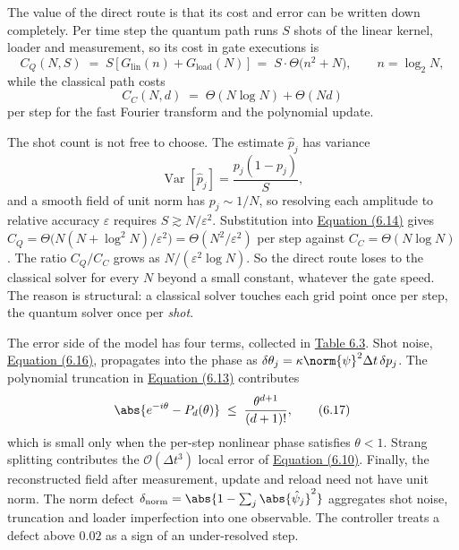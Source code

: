 \documentclass{report}
\theoremstyle{plain}
\theoremstyle{definition}
\theoremstyle{remark}
\newcommand{\bigO}[1]{\mathcal{O}\!\left(#1\right)}
\newcommand{\eps}{\varepsilon}
\begin{document}
The value of the direct route is that its cost and error can be written down completely. Per time step the quantum path runs $S$ shots of the linear kernel, loader and measurement, so its cost in gate executions is
\hypertarget{eq:syn:costq}{}\[
  C_Q(N,S) \;=\; S\,\big[\,G_{\mathrm{lin}}(n) + G_{\mathrm{load}}(N)\,\big]
  \;=\; S\cdot\Theta\!\big(n^{2}+N\big),\qquad n=\log_2 N,
\tag{6.14}\]
while the classical path costs
\hypertarget{eq:syn:costc}{}\[
  C_C(N,d) \;=\; \Theta(N\log N) + \Theta(Nd)
\tag{6.15}\]
per step for the fast Fourier transform and the polynomial update.

The shot count is not free to choose. The estimate $\hat p_j$ has variance
\hypertarget{eq:syn:shot}{}\[
  \operatorname{Var}[\hat p_j]=\frac{p_j(1-p_j)}{S},
\tag{6.16}\]
and a smooth field of unit norm has $p_j\sim 1/N$, so resolving each amplitude to relative accuracy $\eps$ requires $S\gtrsim N/\eps^{2}$. Substitution into \hyperref[eq:syn:costq]{Equation (6.14)} gives $C_Q=\Theta\big(N(N+\log^{2}N)/\eps^{2}\big)=\Theta(N^{2}/\eps^{2})$ per step against $C_C=\Theta(N\log N)$. The ratio $C_Q/C_C$ grows as $N/(\eps^{2}\log N)$. So the direct route loses to the classical solver for every $N$ beyond a small constant, whatever the gate speed. The reason is structural: a classical solver touches each grid point once per step, the quantum solver once per \emph{shot}.

The error side of the model has four terms, collected in \hyperref[tab:syn:errorbudget]{Table 6.3}. Shot noise, \hyperref[eq:syn:shot]{Equation (6.16)}, propagates into the phase as $\delta\theta_j=\kappa\norm{\psi}^{2}\Delta t\,\delta p_j$. The polynomial truncation in \hyperref[eq:syn:poly]{Equation (6.13)} contributes
\hypertarget{eq:syn:trunc}{}\[
  \abs{e^{-i\theta}-P_d(\theta)}\;\le\;\frac{\theta^{d+1}}{(d+1)!},
\tag{6.17}\]
which is small only when the per-step nonlinear phase satisfies $\theta<1$. Strang splitting contributes the $\bigO{\Delta t^{3}}$ local error of \hyperref[eq:syn:strang]{Equation (6.10)}. Finally, the reconstructed field after measurement, update and reload need not have unit norm. The norm defect $\delta_{\mathrm{norm}}=\abs{1-\sum_j\abs{\hat\psi_j}^{2}}$ aggregates shot noise, truncation and loader imperfection into one observable. The controller treats a defect above $0.02$ as a sign of an under-resolved step.
\end{document}

